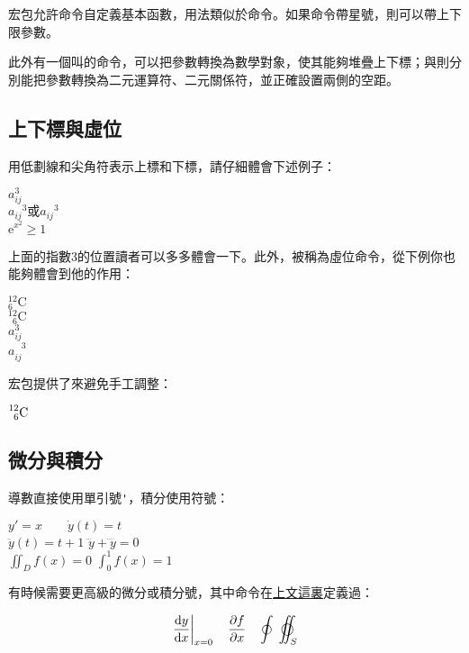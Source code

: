 宏包允許命令自定義基本函數，用法類似於命令。如果命令帶星號，則可以帶上下限參數。

此外有一個叫的命令，可以把參數轉換為數學對象，使其能夠堆疊上下標；與則分別能把參數轉換為二元運算符、二元關係符，並正確設置兩側的空距。

\subsection{上下標與虛位}
用低劃線和尖角符表示上標和下標，請仔細體會下述例子：

\begin{codeshow}
$a^3_{ij}$ \\
${a_{ij}}^3\text{或}a_{ij}{}^3$\\
$\mathrm{e}^{x^2}\geq 1$
\end{codeshow}

上面的指數3的位置讀者可以多多體會一下。此外，被稱為虛位命令，從下例你也能夠體會到他的作用：

\begin{codeshow}
${}^{12}_{6}\mathrm{C}$ \\
${}^{12}_{\phantom{1}6}
\mathrm{C}$ \\
$a^3_{ij}$ \\
$a^{\phantom{ij}3}_{ij}$
\end{codeshow}

宏包提供了來避免手工調整：
\begin{codeshow}
$\prescript{12}{6}{\mathrm{C}}$
\end{codeshow}

\subsection{微分與積分}
導數直接使用單引號\verb|'|，積分使用符號：

\begin{codeshow}
$y'=x \qquad \dot{y}(t)=t$ \\
$\ddot{y}(t)=t+1$
$\dddot{y}+\ddddot{y}=0$ \\
$\iint_{D}f(x)=0$
$\int_{0}^{1}f(x)=1$
\end{codeshow}

有時候需要更高級的微分或積分號，其中命令在\hyperref[cmd:ud]{上文這裏}定義過：
\begin{codeshow}
\[\left.\frac{\ud y}{\ud x}\right|_{x=0}\quad
\frac{\partial f}{\partial x}
\quad\oint\;\varoiint_S \]
\end{codeshow}


